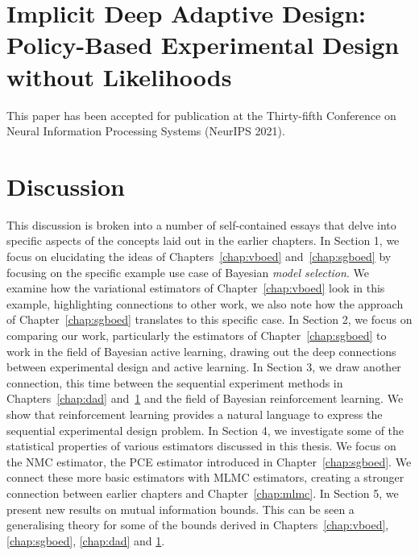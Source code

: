 \documentclass[a4paper, 10pt]{report}
\theoremstyle{plain}
\begin{document}
	\chapter{Implicit Deep Adaptive Design: Policy-Based Experimental Design without Likelihoods}
	\label{chap:idad}
	This paper has been accepted for publication at the Thirty-fifth Conference on Neural Information Processing Systems (NeurIPS 2021).
	
	
	
	\chapter{Discussion}
	\label{chap:discussion}
	This discussion is broken into a number of self-contained essays that delve into specific aspects of the concepts laid out in the earlier chapters.
	In Section 1, we focus on elucidating the ideas of Chapters~\ref{chap:vboed} and~\ref{chap:sgboed} by focusing on the specific example use case of Bayesian \emph{model selection}. We examine how the variational estimators of Chapter~\ref{chap:vboed} look in this example, highlighting connections to other work, we also note how the approach of Chapter~\ref{chap:sgboed} translates to this specific case.
	In Section 2, we focus on comparing our work, particularly the estimators of Chapter~\ref{chap:sgboed} to work in the field of Bayesian active learning, drawing out the deep connections between experimental design and active learning.
	In Section 3, we draw another connection, this time between the sequential experiment methods in Chapters~\ref{chap:dad} and~\ref{chap:idad} and the field of Bayesian reinforcement learning. We show that reinforcement learning provides a natural language to express the sequential experimental design problem.
	In Section 4, we investigate some of the statistical properties of various estimators discussed in this thesis. We focus on the NMC estimator, the PCE estimator introduced in Chapter~\ref{chap:sgboed}. We connect these more basic estimators with MLMC estimators, creating a stronger connection between earlier chapters and Chapter~\ref{chap:mlmc}.
	In Section 5, we present new results on mutual information bounds. This can be seen a generalising theory for some of the bounds derived in Chapters~\ref{chap:vboed}, \ref{chap:sgboed}, \ref{chap:dad} and \ref{chap:idad}.
	
	
	
	
\end{document}

